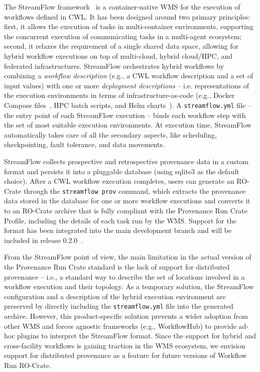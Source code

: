 The StreamFlow framework~\cite{Colonnelli 2021} is a container-native WMS for the execution of workflows defined in CWL.
It has been designed around two primary principles: first, it allows the execution of tasks in multi-container environments, supporting the concurrent execution of communicating tasks in a multi-agent ecosystem; second, it relaxes the requirement of a single shared data space, allowing for hybrid workflow executions on top of multi-cloud, hybrid cloud/HPC, and federated infrastructures.
StreamFlow orchestrates hybrid workflows by combining a \emph{workflow description} (e.g., a CWL workflow description and a set of input values) with one or more \emph{deployment descriptions} -- i.e.
representations of the execution environments in terms of infrastructure-as-code (e.g., Docker Compose files~\cite{Reis 2022}, HPC batch scripts, and Helm charts~\cite{Zerouali 2023}).
A \texttt{streamflow.yml} file -- the entry point of each StreamFlow execution -- binds each workflow step with the set of most suitable execution environments.
At execution time, StreamFlow automatically takes care of all the secondary aspects, like scheduling, checkpointing, fault tolerance, and data movements.

StreamFlow collects prospective and retrospective provenance data in a custom format and persists it into a pluggable database (using sqlite3 as the default choice).
After a CWL workflow execution completes, users can generate an RO-Crate through the \texttt{streamflow prov}
command, which extracts the provenance data stored in the database for one or more workflow executions and converts it to an RO-Crate archive that is fully compliant with the Provenance Run Crate Profile, including the details of each task run by the WMS.
Support for the format has been integrated into the main development branch and will be included in release 0.2.0~\cite{Colonnelli 2023b}.

From the StreamFlow point of view, the main limitation in the actual version of the Provenance Run Crate standard is the lack of support for distributed provenance -- i.e., a standard way to describe the set of locations involved in a workflow execution and their topology. As a temporary solution,
the StreamFlow configuration and a description of the hybrid execution environment are preserved by directly including the \texttt{streamflow.yml} file into the generated archive.
However, this product-specific solution prevents a wider adoption from other WMS and forces agnostic frameworks (e.g., WorkflowHub) to provide ad-hoc plugins to interpret the StreamFlow format.
Since the support for hybrid and cross-facility workflows is gaining traction in the WMS ecosystem, we envision support for distributed provenance as a feature for future versions of Workflow Run RO-Crate.

